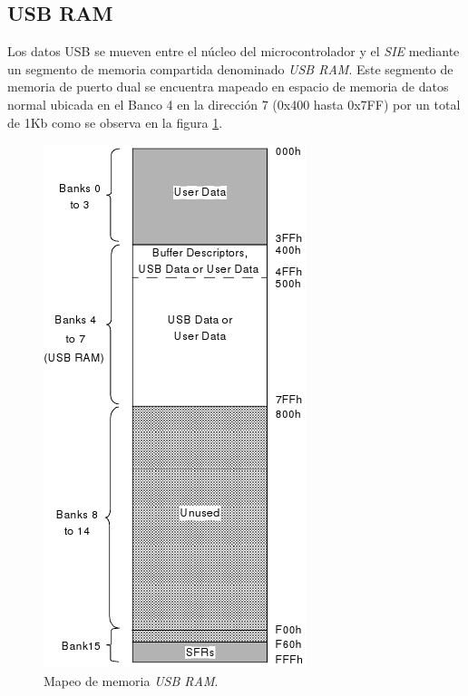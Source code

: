 \subsection{USB RAM}
Los datos USB se mueven entre el n\'ucleo del microcontrolador y el \emph{SIE}
mediante un segmento de memoria compartida denominado \emph{USB RAM}.
Este segmento de memoria de puerto dual se encuentra mapeado en espacio de
memoria de datos normal ubicada en el Banco 4 en la direcci\'on 7 (0x400 hasta
0x7FF) por un total de 1Kb como se observa en la figura \ref{fig:usb_mem}.

\begin{figure}
\centering
\includegraphics[scale=0.6]{./img/usb_mem.png}
\caption{Mapeo de memoria \emph{USB RAM}.}
\label{fig:usb_mem}
\end{figure}










\clearpage
